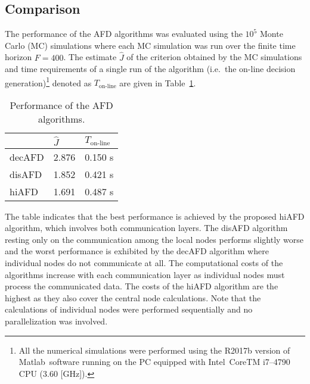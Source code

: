 \documentclass[conference,10pt]{IEEEtran}
\begin{document}
\subsection{Comparison}\label{sec:comparison}
The performance of the AFD algorithms was evaluated using the $10^5$ Monte Carlo (MC) simulations where each MC simulation was run over the finite time horizon $F=400$. 
The  estimate $\hat{J}$ of the criterion obtained by the MC simulations and time requirements  of a single run of the algorithm (i.e.~the on-line
decision generation)\footnote{All the numerical simulations were performed using the R2017b version of Matlab\textregistered\ software running on the PC
equipped with Intel\textregistered\ CoreTM i7--4790 CPU (3.60 [GHz]).} denoted as $T_{\text{on-line}}$ are given in Table~\ref{tab:performance}.
\begin{table}[ht]
\renewcommand{\arraystretch}{1.2}
  \begin{center}
    \caption{Performance of the AFD algorithms.}\label{tab:performance}
    \begin{tabular}{lll}\toprule
      &$\hat{J}$& $T_{\text{on-line}}$\\\midrule
      decAFD     & 2.876 &0.150 \si{\second}\\
      disAFD     & 1.852 &0.421 \si{\second}\\
      hiAFD      & 1.691 &0.487 \si{\second}\\\bottomrule
\end{tabular} 
\end{center}
\end{table}

The table indicates that the best performance is achieved by the proposed hiAFD algorithm, which involves both communication layers.
The disAFD algorithm resting only on the communication among the local nodes performs slightly worse and the worst performance is exhibited by the decAFD algorithm where individual nodes do not communicate at all. 
The computational costs of the algorithms increase with each communication layer as individual nodes must process the communicated data.
The costs of the hiAFD algorithm are the highest as they also cover the central node calculations.
Note that the calculations of individual nodes were performed sequentially and no parallelization was involved. 
\end{document}
